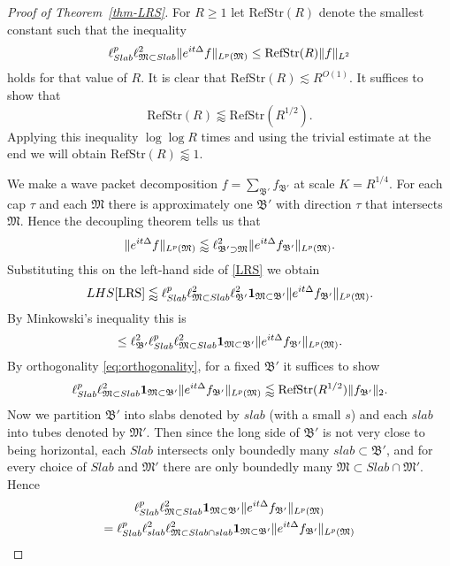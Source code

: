 \documentclass[biblatex]{pzorin-note}
\newcommand{\eit}{e^{i t \Delta}}
\newcommand{\RefStr}{\mathrm{RefStr}}
\newcommand{\bM}{\mathfrak{M}} %
\newcommand{\bBp}{\mathfrak{B}'} %
\newcommand{\bMp}{\mathfrak{M}'} %
\begin{document}
\begin{proof}[Proof of Theorem~\ref{thm-LRS}]
For $R\geq 1$ let $\RefStr(R)$ denote the smallest constant such that the inequality
\begin{equation} \label{LRS-const}
\ell^{p}_{Slab} \ell^{2}_{\bM \subset Slab} \norm{ \eit f }_{L^{p}(\bM)}
\leq
\RefStr(R) \norm{ f }_{L^2}
\end{equation}
holds for that value of $R$.
It is clear that $\RefStr(R) \lesssim R^{O(1)}$.
It suffices to show that
\begin{equation}\label{eq:RS-recursion}
\RefStr(R) \lessapprox \RefStr(R^{1/2}).
\end{equation}
Applying this inequality $\log\log R$ times and using the trivial estimate at the end we will obtain $\RefStr(R) \lessapprox 1$.

We make a wave packet decomposition $f = \sum_{\bBp} f_{\bBp}$ at scale $K=R^{1/4}$.
For each cap $\tau$ and each $\bM$ there is approximately one $\bBp$ with direction $\tau$ that intersects $\bM$.
Hence the decoupling theorem tells us that
\begin{equation}
\norm{ e^{i t \Delta} f }_{L^{p}(\bM)}
\lessapprox
\ell^{2}_{\bBp \supset \bM} \norm{ \eit f_{\bBp} }_{L^{p}(\bM)}.
\end{equation}
Substituting this on the left-hand side of \eqref{LRS} we obtain
\[
LHS\eqref{LRS}
\lessapprox
\ell^{p}_{Slab} \ell^{2}_{\bM \subset Slab} \ell^{2}_{\bBp} \one_{\bM \subset \bBp} \norm{ \eit f_{\bBp} }_{L^{p}(\bM)}.
\]
By Minkowski's inequality this is
\[
\leq
\ell^{2}_{\bBp} \ell^{p}_{Slab} \ell^{2}_{\bM \subset Slab} \one_{\bM \subset \bBp} \norm{ \eit f_{\bBp} }_{L^{p}(\bM)}.
\]
By orthogonality \eqref{eq:orthogonality}, for a fixed $\bBp$ it suffices to show
\[
\ell^{p}_{Slab} \ell^{2}_{\bM \subset Slab} \one_{\bM \subset \bBp} \norm{ \eit f_{\bBp} }_{L^{p}(\bM)}
\lessapprox
\RefStr(R^{1/2}) \norm{f_{\bBp}}_{2}.
\]
Now we partition $\bBp$ into slabs denoted by $slab$ (with a small $s$) and each $slab$ into tubes denoted by $\bMp$.
Then since the long side of $\bBp$ is not very close to being horizontal, each $Slab$ intersects only boundedly many $slab \subset \bBp$, and for every choice of $Slab$ and $\bMp$ there are only boundedly many $\bM \subset Slab \cap \bMp$.
Hence
\begin{multline*}
\ell^{p}_{Slab} \ell^{2}_{\bM \subset Slab} \one_{\bM \subset \bBp} \norm{ \eit f_{\bBp} }_{L^{p}(\bM)}\\
=
\ell^{p}_{Slab} \ell^{2}_{slab} \ell^{2}_{\bM \subset Slab \cap slab} \one_{\bM \subset \bBp} \norm{ \eit f_{\bBp} }_{L^{p}(\bM)}\\

\end{multline*}
\end{proof}
\end{document}
